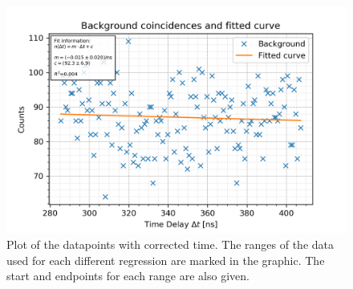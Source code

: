 \documentclass[30pt,a4paper]{article}
\begin{document}
 	\begin{figure}[h]
 		\includegraphics{Bilder/lin_bkgnd}
 		\centering
 		\caption{\small Plot of the datapoints with corrected time. The ranges of the data used for each different regression are marked in the graphic. The start and endpoints for each range are also given.}
 		\label{bckgnd_fit}
 	\end{figure}
 	
\end{document}
